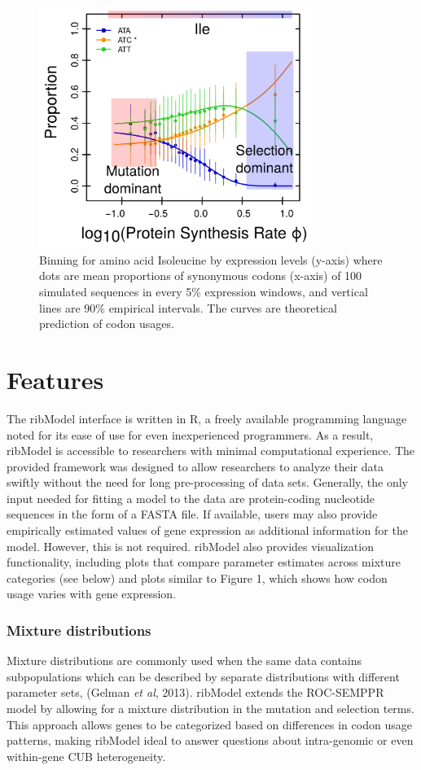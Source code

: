 \documentclass{bioinfo}
\newcommand{\package}{ribModel } %
\begin{document}
\begin{figure}[!tpb]
\centering
 \includegraphics[width=3.5in]{expl_model.png}
\vspace{-0.2cm}
\caption{Binning for amino acid Isoleucine by expression levels (y-axis) where dots are mean proportions of synonymous codons (x-axis) of 100 simulated sequences in every 5\% expression windows, and vertical lines are 90\% empirical intervals. The curves are theoretical prediction of codon usages.
}
\label{fig:plotbin}
\end{figure}

\section*{Features}
The \package interface is written in R, a freely available programming language noted for its ease of use for even inexperienced programmers. As a result, \package is accessible to researchers with minimal computational experience. The provided framework was designed to allow researchers to analyze their data swiftly without the need for long pre-processing of data sets. Generally, the only input needed for fitting a model to the data are protein-coding nucleotide sequences in the form of a FASTA file. If available, users may also provide empirically estimated values of gene expression as additional information for the model. However, this is not required.
\package also provides visualization functionality, including plots that compare parameter estimates across mixture categories (see below) and plots similar to Figure 1, which shows how codon usage varies with gene expression.    

\subsubsection*{Mixture distributions}
Mixture distributions are commonly used when the same data contains subpopulations which can be described by separate distributions with different parameter sets, (Gelman \textit{et al}, 2013). \package extends the ROC-SEMPPR model by allowing for a mixture distribution in the mutation and selection terms. This approach allows genes to be categorized based on differences in codon usage patterns, making \package ideal to answer questions about intra-genomic or even within-gene CUB heterogeneity.  
\end{document}
